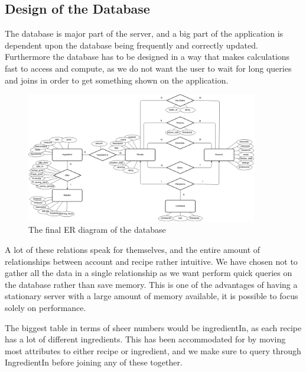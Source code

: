 \subsection{Design of the Database}
\label{subsec:dbdesign}

The database is major part of the server, and a big part of the application is dependent upon the database being frequently and correctly updated. Furthermore the database has to be designed in a way that makes calculations fast to access and compute, as we do not want the user to wait for long queries and joins in order to get something shown on the application. 

\begin{figure}
\label{fig:ER-diagram}
\centering
\includegraphics[width=0.9\textwidth]{Pictures/ERdiagram}
\caption{The final ER diagram of the database}
\end{figure}

A lot of these relations speak for themselves, and the entire amount of relationships between account and recipe rather intuitive. We have chosen not to gather all the data in a single relationship as we want perform quick queries on the database rather than save memory. This is one of the advantages of having a stationary server with a large amount of memory available, it is possible to focus solely on performance. 

The biggest table in terms of sheer numbers would be ingredientIn, as each recipe has a lot of different ingredients. This has been accommodated for by moving most attributes to either recipe or ingredient, and we make sure to query through IngredientIn before joining any of these together.

